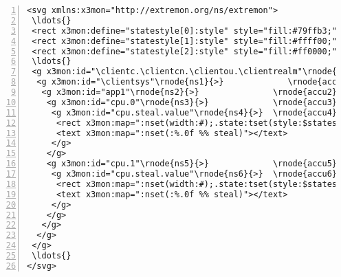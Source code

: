 \documentclass[10pt]{article}
\begin{document}
\begin{Verbatim}[numbers=left,numbersep=6pt,fontsize=\small,commandchars=\\\{\}]
<svg xmlns:x3mon="http://extremon.org/ns/extremon">
 \ldots{} 
 <rect x3mon:define="statestyle[0]:style" style="fill:#79ffb3;"/>
 <rect x3mon:define="statestyle[1]:style" style="fill:#ffff00;"/>
 <rect x3mon:define="statestyle[2]:style" style="fill:#ff0000;"/>
 \ldots{}
 <g x3mon:id="\clientc.\clientcn.\clientou.\clientrealm"\rnode{ns0}{>}   \rnode{accu0}{\textcolor{gray}{\clientc.\clientcn.\clientou.\clientrealm}}
  <g x3mon:id="\clientsys"\rnode{ns1}{>}             \rnode{accu1}{\textcolor{gray}{\clientc.\clientcn.\clientou.\clientrealm.\clientsys}}
   <g x3mon:id="app1"\rnode{ns2}{>}               \rnode{accu2}{\textcolor{gray}{\clientc.\clientcn.\clientou.\clientrealm.\clientsys.app1}}
    <g x3mon:id="cpu.0"\rnode{ns3}{>}             \rnode{accu3}{\textcolor{gray}{\clientc.\clientcn.\clientou.\clientrealm.\clientsys.app1.cpu.0}}
     <g x3mon:id="cpu.steal.value"\rnode{ns4}{>}  \rnode{accu4}{\textcolor{gray}{\clientc.\clientcn.\clientou.\clientrealm.\clientsys.app1.cpu.0.cpu.steal.value}}
      <rect x3mon:map=":nset(width:#);.state:tset(style:$statestyle[#])" width="20" style="\ldots{}
      <text x3mon:map=":nset(:%.0f %% steal)"></text> 
     </g>
    </g>
    <g x3mon:id="cpu.1"\rnode{ns5}{>}             \rnode{accu5}{\textcolor{gray}{\clientc.\clientcn.\clientou.\clientrealm.\clientsys.app1.cpu.1}}
     <g x3mon:id="cpu.steal.value"\rnode{ns6}{>}  \rnode{accu6}{\textcolor{gray}{\clientc.\clientcn.\clientou.\clientrealm.\clientsys.app1.cpu.1.cpu.steal.value}}
      <rect x3mon:map=":nset(width:#);.state:tset(style:$statestyle[#])" width="20" style="\ldots{}
      <text x3mon:map=":nset(:%.0f %% steal)"></text> 
     </g>
    </g>
   </g>
  </g>
 </g>
 \ldots{}
</svg>
\end{Verbatim}

\end{document}
